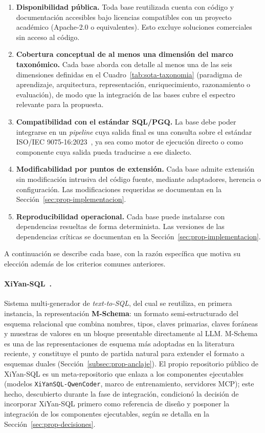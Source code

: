 \begin{enumerate}
    \item \textbf{Disponibilidad pública.} Toda base reutilizada cuenta con código y documentación accesibles bajo licencias compatibles con un proyecto académico (Apache-2.0 o equivalentes). Esto excluye soluciones comerciales sin acceso al código.
    \item \textbf{Cobertura conceptual de al menos una dimensión del marco taxonómico.} Cada base aborda con detalle al menos una de las seis dimensiones definidas en el Cuadro~\ref{tab:sota-taxonomia} (paradigma de aprendizaje, arquitectura, representación, enriquecimiento, razonamiento o evaluación), de modo que la integración de las bases cubre el espectro relevante para la propuesta.
    \item \textbf{Compatibilidad con el estándar \ac{SQL}/\ac{PGQ}.} La base debe poder integrarse en un \emph{pipeline} cuya salida final es una consulta sobre el estándar ISO/IEC 9075-16:2023~\cite{ISO9075_16_2023}, ya sea como motor de ejecución directo o como componente cuya salida pueda traducirse a ese dialecto.
    \item \textbf{Modificabilidad por puntos de extensión.} Cada base admite extensión sin modificación intrusiva del código fuente, mediante adaptadores, herencia o configuración. Las modificaciones requeridas se documentan en la Sección~\ref{sec:prop-implementacion}.
    \item \textbf{Reproducibilidad operacional.} Cada base puede instalarse con dependencias resueltas de forma determinista. Las versiones de las dependencias críticas se documentan en la Sección~\ref{sec:prop-implementacion}.
\end{enumerate}

A continuación se describe cada base, con la razón específica que motiva su elección además de los criterios comunes anteriores.

\paragraph{XiYan-SQL~\cite{XiYan-SQL2024}.} Sistema multi-generador de \emph{text-to-SQL}, del cual se reutiliza, en primera instancia, la representación \textbf{M-Schema}: un formato semi-estructurado del esquema relacional que combina nombres, tipos, claves primarias, claves foráneas y muestras de valores en un bloque presentable directamente al \ac{LLM}. M-Schema es una de las representaciones de esquema más adoptadas en la literatura reciente, y constituye el punto de partida natural para extender el formato a esquemas duales (Sección~\ref{subsec:prop-anclaje}). El propio repositorio público de XiYan-SQL es un meta-repositorio que enlaza a los componentes ejecutables (modelos \texttt{XiYanSQL-QwenCoder}, marco de entrenamiento, servidores MCP); este hecho, descubierto durante la fase de integración, condicionó la decisión de incorporar XiYan-SQL primero como referencia de diseño y posponer la integración de los componentes ejecutables, según se detalla en la Sección~\ref{sec:prop-decisiones}.


